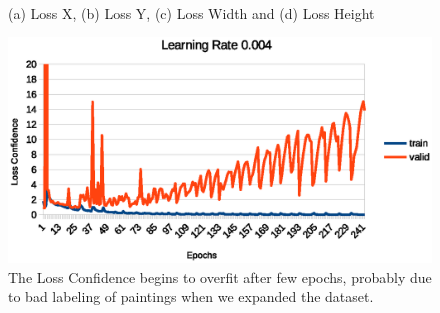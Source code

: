 \documentclass[10pt,twocolumn,letterpaper]{article}
\begin{document}
\begin{figure}
    \centering
    \\
    \caption{(a) Loss X, (b) Loss Y, (c) Loss Width and (d) Loss Height}
    \label{fig:localization_loss}
\end{figure}

\begin{figure}[t]
\begin{center}
   \includegraphics[width=1\linewidth]{loss_conf.eps}
\end{center}
   \caption{The Loss Confidence begins to overfit after few epochs, probably due to bad labeling of
paintings when we expanded the dataset.}
\label{fig:loss_conf}
\label{fig:onecol}
\end{figure}
\end{document}
